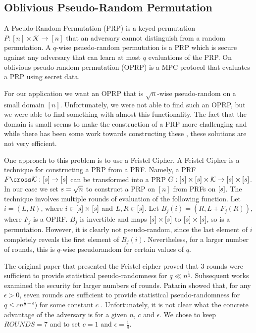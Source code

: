 \subsection{Oblivious Pseudo-Random Permutation}

A Pseudo-Random Permutation (PRP) is a keyed permutation
$P : [n] \times \mathcal{K} \rightarrow [n]$
that an adversary cannot distinguish from a random permutation.
A $q$-wise psuedo-random permutation is a PRP which is secure against
any adversary that can learn at most $q$ evaluations of the PRP.
On oblivious pseudo-random permutation (OPRP) is a MPC protocol
that evaluates a PRP using secret data.

For our application we want an OPRP that is $\sqrt{n}$-wise pseudo-random
on a small domain $[n]$. 
Unfortunately, we were not able to find such an OPRP, but we were able
to find something with almost this functionality.
The fact that the domain is small seems to make the construction of a PRP
more challenging and while there has been some work towards constructing these
\cite{black2002ciphers, morris2009encipher, stefanov2012fastprp},
these solutions are not very efficient.

One approach to this problem is to use a Feistel Cipher.
A Feistel Cipher is a technique for constructing a PRP from a PRF.
Namely, a PRF $F \cross \mathcal{K} : [\prfSize] \rightarrow[\prfSize]$ 
can be transformed into a PRP 
$G : [s] \times [s] \times \mathcal{K} \rightarrow [s] \times [s]$. 
In our case we set $s = \sqrt{n}$ to construct a PRP on 
$[n]$ from PRFs on $[s]$.
The technique involves multiple rounds of evaluation of the following function.
Let $i = (L, R)$, where $i \in [s] \times [s]$ and $L, R \in [s]$.
Let $B_j(i) = (R, L + F_j(R))$, where $F_j$ is a OPRF.
$B_j$ is invertible and maps $[s] \times [s]$ to $[s] \times [s]$, 
so is a permutation.
However, it is clearly not pseudo-random, since the last element of $i$ 
completely reveals the first element of $B_j(i)$.
Nevertheless, for a larger number of rounds, this is $q$-wise 
pseudorandom for certain values of $q$.

The original paper that presented the Feistel cipher \cite{luby1988construct}
proved that 3 rounds were sufficient to provide statistical pseudo-randomness
for $q \ll n^{\frac{1}{4}}$.
Subsequent works examined the security for larger numbers of rounds.
Patarin showed that, for any $\epsilon > 0$,
seven rounds are sufficient to provide statistical pseudo-randomness for 
$q \leq c n^{\frac{1}{2} - \epsilon})$ for some constant $c$ 
\cite{patarin2003luby}.
Unfortunately, it is not clear what the concrete advantage of the
adversary is for a given $n$, $c$ and $\epsilon$.
We chose to keep $ROUNDS=7$ and to set $c=1$ and $\epsilon = \frac{1}{8}$.

